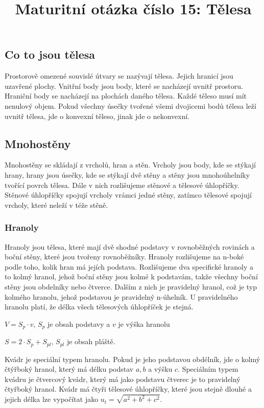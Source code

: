 \documentclass[12pt]{article}
\title{Maturitní otázka číslo 15: Tělesa}
\author{}
\date{}
\begin{document}
\maketitle
\subsection*{Co to jsou tělesa}
Prostorově omezené souvislé útvary se nazývají tělesa. Jejich hranicí jsou uzavřené plochy. Vnitřní
body jsou body, které se nacházejí uvnitř prostoru. Hraniční body se nacházejí na plochách daného
tělesa. Každé těleso musí mít nenulový objem. Pokud všechny úsečky tvořené všemi dvojicemi bodů
tělesa leží uvnitř tělesa, jde o konvexní těleso, jinak jde o nekonvexní.
\subsection*{Mnohostěny}
Mnohostěny se skládají z vrcholů, hran a stěn. Vrcholy jsou body, kde se stýkají hrany, hrany jsou
úsečky, kde se stýkají dvě stěny a stěny jsou mnohoúhelníky tvořící povrch tělesa. Dále v nich
rozlišujeme stěnové a tělesové úhlopříčky. Stěnové úhlopříčky spojují vrcholy vrámci jedné stěny,
zatímco tělesové spojují vrcholy, které neleží v téže stěně.
\subsubsection*{Hranoly}
Hranoly jsou tělesa, které mají dvě shodné podstavy v rovnoběžných rovinách a boční stěny, které
jsou tvořeny rovnoběžníky. Hranoly rozlišujeme na n-boké podle toho, kolik hran má jejích podstava.
Rozlišujeme dva specifické hranoly a to kolmý hranol, jehož boční stěny jsou kolmé k podstavám, takže
všechny boční stěny jsou obdelníky nebo čtverce. Dalším z nich je pravidelný hranol, což je typ
kolmého hranolu, jehož podstavou je pravidelný n-úhelník. U pravidelného hranolu platí, že délka
všech tělesových úhlopříček je stejná.

$V = S_p \cdot v$, $S_p$ je obsah podstavy a $v$ je výška hranolu

$S = 2 \cdot S_p + S_{pl}$, $S_{pl}$ je obsah pláště.

Kvádr je speciální typem hranolu. Pokud je jeho podstavou obdélník, jde o kolmý čtýřboký hranol, který
má délku podstav $a, b$ a výšku $c$. Speciálním typem kvádru je čtvercový kvádr, který má jako 
podstavu čtverec je to pravidelný čtyřboký hranol. Kvádr má čtyři tělesové úhlopříčky, které jsou
stejně dlouhé a jejich délka lze vypočítat jako $u_t = \sqrt{a^2 + b^2 + c^2}$.
\end{document}
